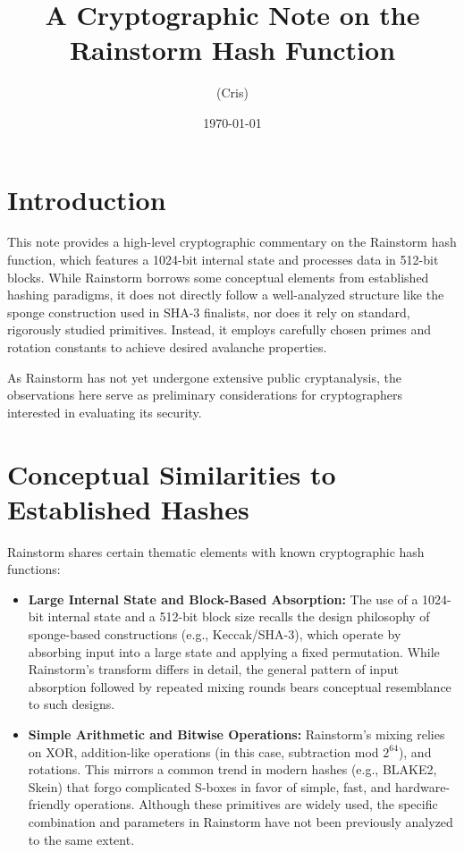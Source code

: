 \documentclass[11pt,a4paper]{article}
\title{A Cryptographic Note on the Rainstorm Hash Function}
\author{(Cris)}
\date{\today}
\begin{document}
\maketitle

\section*{Introduction}
This note provides a high-level cryptographic commentary on the Rainstorm hash function, which features a 1024-bit internal state and processes data in 512-bit blocks. While Rainstorm borrows some conceptual elements from established hashing paradigms, it does not directly follow a well-analyzed structure like the sponge construction used in SHA-3 finalists, nor does it rely on standard, rigorously studied primitives. Instead, it employs carefully chosen primes and rotation constants to achieve desired avalanche properties.

As Rainstorm has not yet undergone extensive public cryptanalysis, the observations here serve as preliminary considerations for cryptographers interested in evaluating its security.

\section*{Conceptual Similarities to Established Hashes}
Rainstorm shares certain thematic elements with known cryptographic hash functions:

\begin{itemize}
  \item \textbf{Large Internal State and Block-Based Absorption:}  
  The use of a 1024-bit internal state and a 512-bit block size recalls the design philosophy of sponge-based constructions (e.g., Keccak/SHA-3), which operate by absorbing input into a large state and applying a fixed permutation. While Rainstorm’s transform differs in detail, the general pattern of input absorption followed by repeated mixing rounds bears conceptual resemblance to such designs.

  \item \textbf{Simple Arithmetic and Bitwise Operations:}  
  Rainstorm’s mixing relies on XOR, addition-like operations (in this case, subtraction mod $2^{64}$), and rotations. This mirrors a common trend in modern hashes (e.g., BLAKE2, Skein) that forgo complicated S-boxes in favor of simple, fast, and hardware-friendly operations. Although these primitives are widely used, the specific combination and parameters in Rainstorm have not been previously analyzed to the same extent.
\end{itemize}
\end{document}
